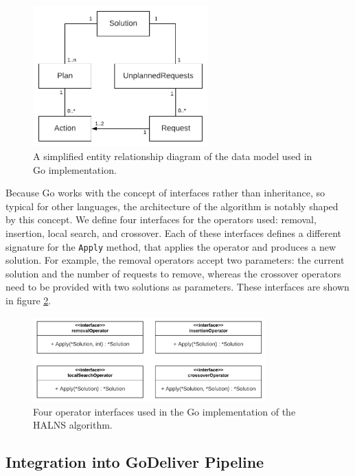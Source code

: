     \begin{figure}[!ht]
        \centering
        \includegraphics[width=0.6\textwidth]{figures/entity-diagram.pdf}
        \caption{A simplified entity relationship diagram of the data model used in Go implementation.}
        \label{fig:entity-diagram}
    \end{figure}
    
    
    Because Go works with the concept of interfaces rather than inheritance, so typical for other languages, the architecture of the algorithm is notably shaped by this concept. We define four interfaces for the operators used: removal, insertion, local search, and crossover. Each of these interfaces defines a different signature for the \texttt{Apply} method, that applies the operator and produces a new solution. For example, the removal operators accept two parameters: the current solution and the number of requests to remove, whereas the crossover operators need to be provided with two solutions as parameters. These interfaces are shown in figure \ref{fig:operators-diagram}.

    
    \begin{figure}[!ht]
        \centering
        \includegraphics[width=0.8\textwidth]{figures/operators-diagram.pdf}
        \caption{Four operator interfaces used in the Go implementation of the HALNS algorithm.}
        \label{fig:operators-diagram}
    \end{figure}  
    
    \subsection{Integration into GoDeliver Pipeline}
    
